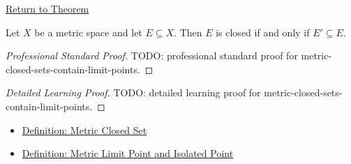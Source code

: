 \newpage
{}
\label{prf:metric-closed-sets-contain-limit-points}

\begin{remark*}[Return]
\hyperref[thm:metric-closed-sets-contain-limit-points]{Return to Theorem}
\end{remark*}

\begin{theorem*}
Let \(X\) be a metric space and let \(E\subseteq X\).  Then \(E\) is closed if
and only if \(E'\subseteq E\).
\end{theorem*}

\begin{proof}[Professional Standard Proof]
\LRAProofBodyStart
TODO: professional standard proof for metric-closed-sets-contain-limit-points.
\end{proof}

\begin{proof}[Detailed Learning Proof]
\LRAProofBodyStart
TODO: detailed learning proof for metric-closed-sets-contain-limit-points.
\end{proof}

\begin{remark*}
\end{remark*}

\begin{dependencies}
\begin{itemize}
  \item \hyperref[def:metric-closed-set]{Definition: Metric Closed Set}
  \item \hyperref[def:metric-limit-point-isolated-point]{Definition: Metric Limit Point and Isolated Point}
\end{itemize}
\end{dependencies}

\clearpage
